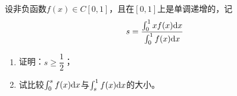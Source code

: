 \begin{proposition}

    设非负函数$f(x) \in C[0,1]$，且在$[0,1]$上是单调递增的，记
    $$s = \dfrac{\int_{0}^{1}{xf(x)}\mathrm{d} x}{\int_{0}^{1}{f(x)}\mathrm{d} x}$$

    \begin{enumerate}

        \item 证明：$s \geq \dfrac{1}{2}$；
        
        \item 试比较$\int_{0}^{s}{f(x)}\mathrm{d} x$与$\int_{s}^{1}{f(x)}\mathrm{d} x$的大小。
        
    \end{enumerate}

\end{proposition}

